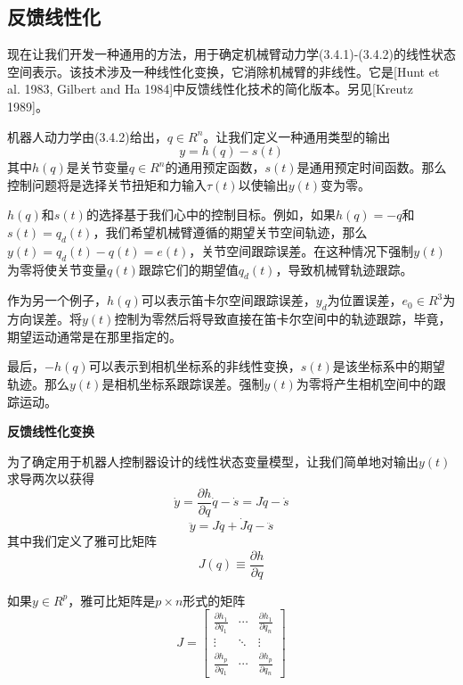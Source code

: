 \documentclass[12pt,a4paper]{ctexart}
\begin{document}
\subsection{反馈线性化}

现在让我们开发一种通用的方法，用于确定机械臂动力学(3.4.1)-(3.4.2)的线性状态空间表示。该技术涉及一种线性化变换，它消除机械臂的非线性。它是[Hunt et al. 1983, Gilbert and Ha 1984]中反馈线性化技术的简化版本。另见[Kreutz 1989]。

机器人动力学由(3.4.2)给出，$q \in R^n$。让我们定义一种通用类型的输出
\begin{equation}
y = h(q) - s(t)
\end{equation}
其中$h(q)$是关节变量$q \in R^n$的通用预定函数，$s(t)$是通用预定时间函数。那么控制问题将是选择关节扭矩和力输入$\tau(t)$以使输出$y(t)$变为零。

$h(q)$和$s(t)$的选择基于我们心中的控制目标。例如，如果$h(q) = -q$和$s(t) = q_d(t)$，我们希望机械臂遵循的期望关节空间轨迹，那么$y(t) = q_d(t) - q(t) = e(t)$，关节空间跟踪误差。在这种情况下强制$y(t)$为零将使关节变量$q(t)$跟踪它们的期望值$q_d(t)$，导致机械臂轨迹跟踪。

作为另一个例子，$h(q)$可以表示笛卡尔空间跟踪误差，$y_d$为位置误差，$e_0 \in R^3$为方向误差。将$y(t)$控制为零然后将导致直接在笛卡尔空间中的轨迹跟踪，毕竟，期望运动通常是在那里指定的。

最后，$-h(q)$可以表示到相机坐标系的非线性变换，$s(t)$是该坐标系中的期望轨迹。那么$y(t)$是相机坐标系跟踪误差。强制$y(t)$为零将产生相机空间中的跟踪运动。

\textbf{反馈线性化变换}

为了确定用于机器人控制器设计的线性状态变量模型，让我们简单地对输出$y(t)$求导两次以获得
\begin{equation}
\dot{y} = \frac{\partial h}{\partial q}\dot{q} - \dot{s} = J\dot{q} - \dot{s}
\end{equation}
\begin{equation}
\ddot{y} = J\ddot{q} + \dot{J}\dot{q} - \ddot{s}
\end{equation}
其中我们定义了雅可比矩阵
\begin{equation}
J(q) \equiv \frac{\partial h}{\partial q}
\end{equation}

如果$y \in R^p$，雅可比矩阵是$p \times n$形式的矩阵
\begin{equation}
J = \begin{bmatrix} \frac{\partial h_1}{\partial q_1} & \cdots & \frac{\partial h_1}{\partial q_n} \\ \vdots & \ddots & \vdots \\ \frac{\partial h_p}{\partial q_1} & \cdots & \frac{\partial h_p}{\partial q_n} \end{bmatrix}
\end{equation}
\end{document}
